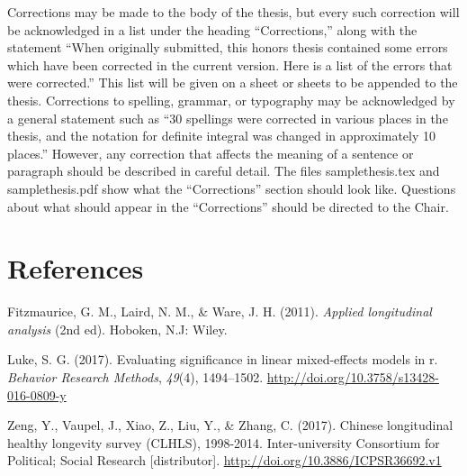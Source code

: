 \documentclass[12pt, twoside]{amherstthesis}
\begin{document}
Corrections may be made to the body of the thesis, but every such correction will be acknowledged in a list under the heading ``Corrections,'' along with the statement ``When originally submitted, this honors thesis contained some errors which have been corrected in the current version. Here is a list of the errors that were corrected.'' This list will be given on a sheet or sheets to be appended to the thesis. Corrections to spelling, grammar, or typography may be acknowledged by a general statement such as ``30 spellings were corrected in various places in the thesis, and the notation for definite integral was changed in approximately 10 places.'' However, any correction that affects the meaning of a sentence or paragraph should be described in careful detail. The files samplethesis.tex and samplethesis.pdf show what the ``Corrections'' section should look like. Questions about what should appear in the ``Corrections'' should be directed to the Chair.

\backmatter

\hypertarget{references}{%
\chapter*{References}\label{references}}

\noindent

\setlength{\parindent}{-0.20in}
\setlength{\leftskip}{0.20in}
\setlength{\parskip}{8pt}

\hypertarget{refs}{}
\leavevmode\hypertarget{ref-fitzmaurice_applied_2011}{}%
Fitzmaurice, G. M., Laird, N. M., \& Ware, J. H. (2011). \emph{Applied longitudinal analysis} (2nd ed). Hoboken, N.J: Wiley.

\leavevmode\hypertarget{ref-luke_evaluating_2017}{}%
Luke, S. G. (2017). Evaluating significance in linear mixed-effects models in r. \emph{Behavior Research Methods}, \emph{49}(4), 1494--1502. \url{http://doi.org/10.3758/s13428-016-0809-y}

\leavevmode\hypertarget{ref-zeng_chinese_2017}{}%
Zeng, Y., Vaupel, J., Xiao, Z., Liu, Y., \& Zhang, C. (2017). Chinese longitudinal healthy longevity survey (CLHLS), 1998-2014. Inter-university Consortium for Political; Social Research {[}distributor{]}. \url{http://doi.org/10.3886/ICPSR36692.v1}

\end{document}
